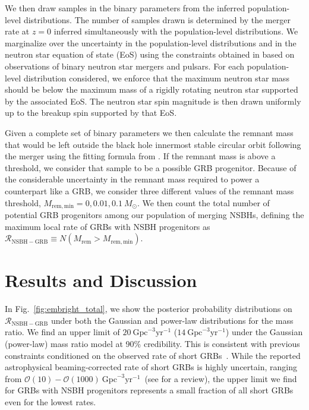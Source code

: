 \documentclass[twocolumn]{aastex631}
\begin{document}
We then draw samples in the binary parameters from the inferred population-level distributions. The number of samples drawn is determined by the merger rate at $z=0$ inferred simultaneously with the population-level distributions. We marginalize over the uncertainty in the population-level distributions and in the neutron star equation of state (EoS) using the constraints obtained in \cite{Legred:2021hdx} based on observations of binary neutron star mergers and pulsars. For each population-level distribution considered, we enforce that the maximum neutron star mass should be below the maximum mass of a rigidly rotating neutron star supported by the associated EoS. The neutron star spin magnitude is then drawn uniformly up to the breakup spin supported by that EoS. 

Given a complete set of binary parameters %
we then calculate the remnant mass that would be left outside the black hole innermost stable circular orbit following the merger using the fitting formula from \cite{Foucart:2018rjc}. If the remnant mass is above a threshold, we consider that sample to be a possible GRB progenitor. Because of the considerable uncertainty in the remnant mass required to power a counterpart like a GRB, we consider three different values of the remnant mass threshold, $M_{\mathrm{rem,min}}=0, 0.01, 0.1~M_{\odot}$. %
We then count the total number of potential GRB progenitors among our population of merging NSBHs, defining the maximum local rate of GRBs with NSBH progenitors as $\mathcal{R}_{\mathrm{NSBH-GRB}} \equiv N(M_{\mathrm{rem}} > M_{\mathrm{rem, min}})$.

\section{Results and Discussion}
In Fig.~\ref{fig:embright_total}, we show the posterior probability distributions on $\mathcal{R}_{\mathrm{NSBH-GRB}}$ under both the Gaussian and power-law distributions for the mass ratio. We find an upper limit of $20~\mathrm{Gpc}^{-3}\mathrm{yr}^{-1}$ ($14~\mathrm{Gpc}^{-3}\mathrm{yr}^{-1}$) under the Gaussian (power-law) mass ratio model at 90\% credibility. This is consistent with previous constraints conditioned on the observed rate of short GRBs~\citep{Sarin:2022cmu}. While the reported astrophysical beaming-corrected rate of short GRBs is highly uncertain, ranging from $\mathcal{O}(10)-\mathcal{O}(1000)~\mathrm{Gpc}^{-3}\mathrm{yr}^{-1}$~(see \citealt{Mandel:2021smh} for a review), the upper limit we find for GRBs with NSBH progenitors represents a small fraction of all short GRBs even for the lowest rates. 
\end{document}
